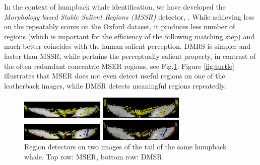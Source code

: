 \documentclass{article}
\begin{document}
In the context of humpback whale identification, we have developed the {\em Morphology based Stable Salient Regions (MSSR)} detector, \cite{RangMSSR06, RangHumpb06}. While achieving less on the repeatably scores on the Oxford dataset, it produces less number of regions (which is important for the efficiency of the following matching step) and much better coincides with the human salient perception. DMRS is simpler and faster than MSSR, while pertains the perceptually salient property, in contrast of the often redundant concentric MSER regions, see Fig.\ref{fig:tails}. Figure \ref{fig:turtle} illustrates that MSER does not even detect useful regions on one of the leatherback images, while DMSR detects meaningful regions repeatedly.

\begin{figure}[htb]

\begin{minipage}[b]{.48\linewidth}
  \centering
  \centerline{\includegraphics[width=4.0cm]{./Figs/mserTailA}}
\end{minipage}
\begin{minipage}[b]{0.48\linewidth}
  \centering
  \centerline{\includegraphics[width=4.0cm]{./Figs/mserTailB}}
\end{minipage}

\begin{minipage}[b]{.48\linewidth}
  \centering
  \centerline{\includegraphics[width=4.0cm]{./Figs/dmsrTailA}}
\end{minipage}
\begin{minipage}[b]{0.48\linewidth}
  \centering
  \centerline{\includegraphics[width=4.0cm]{./Figs/dmsrTailB}}
\end{minipage}
 \vspace{-0.2cm}
\caption{Region detectors on two images of the tail of the same humpback whale. 
Top row: MSER, bottom row: DMSR.}
\label{fig:tails}
%
\end{figure}
\end{document}
